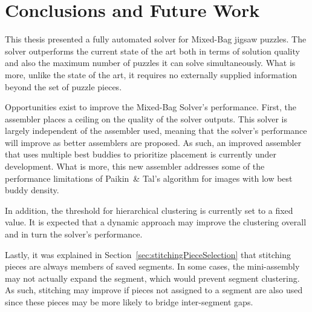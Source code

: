 \chapter{Conclusions and Future Work}

This thesis presented a fully automated solver for Mixed-Bag jigsaw puzzles.  The solver outperforms the current state of the art both in terms of solution quality and also the maximum number of puzzles it can solve simultaneously.  What is more, unlike the state of the art, it requires no externally supplied information beyond the set of puzzle pieces.

Opportunities exist to improve the Mixed-Bag Solver's performance.  First, the assembler places a ceiling on the quality of the solver outputs.  This solver is largely independent of the assembler used, meaning that the solver's performance will improve as better assemblers are proposed. As such, an improved assembler that uses multiple best buddies to prioritize placement is currently under development.  What is more, this new assembler addresses some of the performance limitations of Paikin~\& Tal's algorithm for images with low best buddy density.

In addition, the threshold for hierarchical clustering is currently set to a fixed value.  It is expected that a dynamic approach may improve the clustering overall and in turn the solver's performance.

Lastly, it was explained in Section~\ref{sec:stitchingPieceSelection} that stitching pieces are always members of saved segments.  In some cases, the mini-assembly may not actually expand the segment, which would prevent segment clustering.  As such, stitching may improve if pieces not assigned to a segment are also used since these pieces may be more likely to bridge inter-segment gaps.